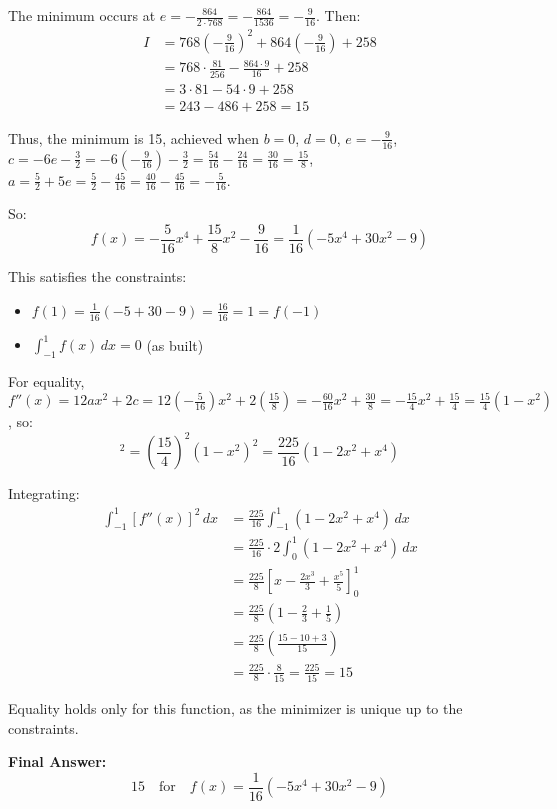 \documentclass[12pt,a4paper]{article}
\theoremstyle{definition}
\begin{document}
    The minimum occurs at $e = -\frac{864}{2 \cdot 768} = -\frac{864}{1536} = -\frac{9}{16}$. Then:
    \begin{align}
        I &= 768 \left(-\frac{9}{16}\right)^2 + 864 \left(-\frac{9}{16}\right) + 258 \\
        &= 768 \cdot \frac{81}{256} - \frac{864 \cdot 9}{16} + 258 \\
        &= 3 \cdot 81 - 54 \cdot 9 + 258 \\
        &= 243 - 486 + 258 = 15
    \end{align}

    Thus, the minimum is 15, achieved when $b = 0$, $d = 0$, $e = -\frac{9}{16}$, $c = -6e - \frac{3}{2} = -6(-\frac{9}{16}) - \frac{3}{2} = \frac{54}{16} - \frac{24}{16} = \frac{30}{16} = \frac{15}{8}$, $a = \frac{5}{2} + 5e = \frac{5}{2} - \frac{45}{16} = \frac{40}{16} - \frac{45}{16} = -\frac{5}{16}$.

    So:
    \begin{equation}
        f(x) = -\frac{5}{16} x^4 + \frac{15}{8} x^2 - \frac{9}{16} = \frac{1}{16} (-5x^4 + 30x^2 - 9)
    \end{equation}

    This satisfies the constraints:
    \begin{itemize}
        \item $f(1) = \frac{1}{16}(-5 + 30 - 9) = \frac{16}{16} = 1 = f(-1)$
        \item $\int_{-1}^{1} f(x) \, dx = 0$ (as built)
    \end{itemize}

    For equality, $f''(x) = 12a x^2 + 2c = 12(-\frac{5}{16}) x^2 + 2(\frac{15}{8}) = -\frac{60}{16} x^2 + \frac{30}{8} = -\frac{15}{4} x^2 + \frac{15}{4} = \frac{15}{4} (1 - x^2)$, so:
    \begin{equation}
    [f''(x)]^2 = \left( \frac{15}{4} \right)^2 (1 - x^2)^2 = \frac{225}{16} (1 - 2x^2 + x^4)
    \end{equation}

    Integrating:
    \begin{align}
        \int_{-1}^{1} [f''(x)]^2 \, dx &= \frac{225}{16} \int_{-1}^{1} (1 - 2x^2 + x^4) \, dx \\
        &= \frac{225}{16} \cdot 2 \int_{0}^{1} (1 - 2x^2 + x^4) \, dx \\
        &= \frac{225}{8} \left[ x - \frac{2x^3}{3} + \frac{x^5}{5} \right]_{0}^{1} \\
        &= \frac{225}{8} \left(1 - \frac{2}{3} + \frac{1}{5}\right) \\
        &= \frac{225}{8} \left( \frac{15 - 10 + 3}{15} \right) \\
        &= \frac{225}{8} \cdot \frac{8}{15} = \frac{225}{15} = 15
    \end{align}

    Equality holds only for this function, as the minimizer is unique up to the constraints.

    \textbf{Final Answer:}
    \begin{equation}
        \boxed{15} \quad \text{for} \quad f(x) = \frac{1}{16} \left( -5x^{4} + 30x^{2} - 9 \right)
    \end{equation}
\end{document}
